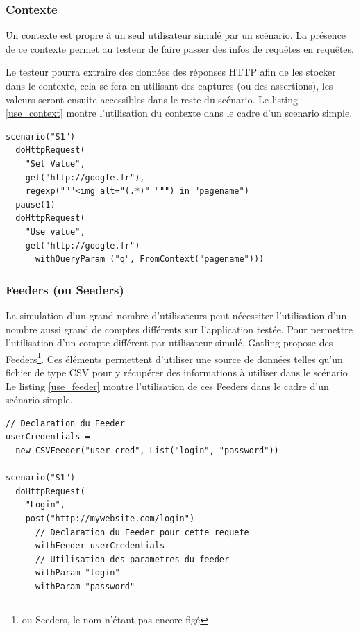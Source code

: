 \subsubsection{Contexte}
Un contexte est propre à un seul utilisateur simulé par un scénario. La présence de ce contexte permet au testeur de faire passer des infos de requêtes en requêtes.

Le testeur pourra extraire des données des réponses HTTP afin de les stocker dans le contexte, cela se fera en utilisant des captures (ou des assertions), les valeurs seront ensuite accessibles dans le reste du scénario. Le listing \ref{use_context} montre l'utilisation du contexte dans le cadre d'un scenario simple.

\begin{lstlisting}[caption={Utilisation du contexte},label={use_context}]
scenario("S1")
  doHttpRequest(
    "Set Value",
    get("http://google.fr"),
    regexp("""<img alt="(.*)" """) in "pagename")
  pause(1)
  doHttpRequest(
  	"Use value",
  	get("http://google.fr") 
  	  withQueryParam ("q", FromContext("pagename")))
\end{lstlisting}

\subsubsection{Feeders (ou Seeders)}
\label{feeders}
La simulation d'un grand nombre d'utilisateurs peut nécessiter l'utilisation d'un nombre aussi grand de comptes différents sur l'application testée. Pour permettre l'utilisation d'un compte différent par utilisateur simulé, Gatling propose des Feeders\footnote{ou Seeders, le nom n'étant pas encore figé}. Ces éléments permettent d'utiliser une source de données telles qu'un fichier de type CSV pour y récupérer des informations à utiliser dans le scénario. Le listing \ref{use_feeder} montre l'utilisation de ces Feeders dans le cadre d'un scénario simple.

\begin{lstlisting}[caption={Utilisation des Feeders},label={use_feeder}]
// Declaration du Feeder
userCredentials = 
  new CSVFeeder("user_cred", List("login", "password"))

scenario("S1")
  doHttpRequest(
    "Login",
    post("http://mywebsite.com/login")
      // Declaration du Feeder pour cette requete
      withFeeder userCredentials
      // Utilisation des parametres du feeder
      withParam "login"
      withParam "password"
\end{lstlisting}